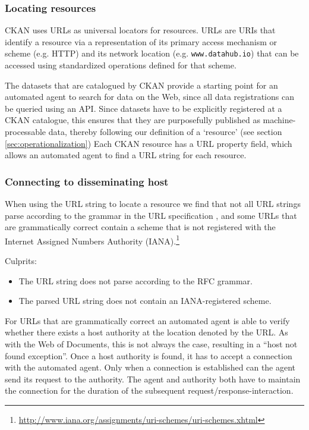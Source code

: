 \subsubsection*{Locating resources}

CKAN uses URLs as universal locators for resources.
URLs are URIs that identify a resource via a representation of
 its primary access mechanism or scheme (e.g. HTTP)
 and its network location (e.g. \texttt{www.datahub.io})
 that can be accessed using standardized operations
 defined for that scheme. \cite{Rfc3305}

The datasets that are catalogued by CKAN provide
 a starting point for an automated agent to search for data on the Web,
 since all data registrations can be queried using an API.
Since datasets have to be explicitly registered at a CKAN catalogue,
 this ensures that they are purposefully published
 as machine-processable data,
 thereby following our definition of a `resource'
 (see section \ref{sec:operationalization})
Each CKAN resource has a URL property field,
 which allows an automated agent to find a URL string for each resource.

\subsubsection*{Connecting to disseminating host}

When using the URL string to locate a resource we find that
 not all URL strings parse according to the grammar
 in the URL specification \cite{Rfc3986},
 and some URLs that are grammatically correct contain a scheme
 that is not registered with
 the Internet Assigned Numbers Authority
 (IANA).\footnote{\url{http://www.iana.org/assignments/uri-schemes/uri-schemes.xhtml}}

Culprits:
\begin{itemize}[noitemsep,nolistsep]
  \item The URL string does not parse according to the RFC grammar.
  \item The parsed URL string does not contain an IANA-registered scheme.
\end{itemize}

For URLs that are grammatically correct an automated agent is able to
 verify whether there exists a host authority at the location
 denoted by the URL.
As with the Web of Documents, this is not always the case,
 resulting in a ``host not found exception''.
Once a host authority is found, it has to accept a connection
 with the automated agent.
Only when a connection is established can the agent send its request
 to the authority.
The agent and authority both have to maintain the connection
 for the duration of the subsequent request/response-interaction.

